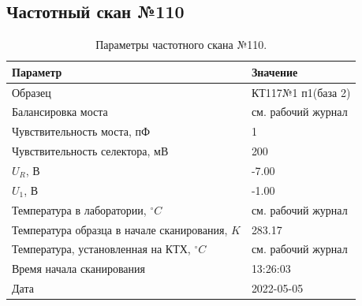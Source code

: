 \subsection{Частотный скан №110}
\begin{table}[!ht]
    \centering
    \caption{Параметры частотного скана №110.}
    \begin{tabular}{|l|l|}
        \hline
        Параметр                                       & Значение                  \\ \hline
        Образец                                        & КТ117№1 п1(база 2)        \\ \hline
        Балансировка моста                             & см. рабочий журнал        \\ \hline
        Чувствительность моста, пФ                     & 1                         \\ \hline
        Чувствительность селектора, мВ                 & 200                       \\ \hline
        $U_R$, В                                       & -7.00                     \\ \hline
        $U_1$, В                                       & -1.00                     \\ \hline
        Температура в лаборатории, $^\circ C$          & см. рабочий журнал        \\ \hline
        Температура образца в начале сканирования, $K$ & 283.17                    \\ \hline
        Температура, установленная на КТХ, $^\circ C$  & см. рабочий журнал        \\ \hline
        Время начала сканирования                      & 13:26:03                  \\ \hline
        Дата                                           & 2022-05-05                \\ \hline
    \end{tabular}
    \label{table:frequency_scan_110}
\end{table}

